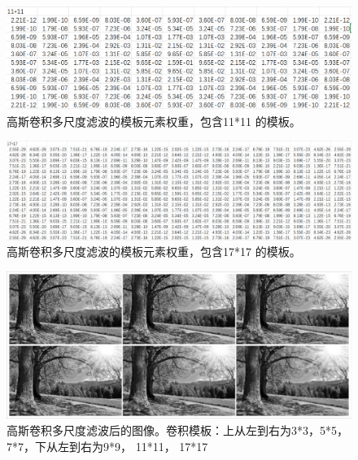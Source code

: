 \documentclass[10pt,twocolumn,letterpaper]{article}
\begin{document}
\begin{figure}[th]
   \centering
   \includegraphics[width=0.95\linewidth]{matrix2.png}
   \caption{高斯卷积多尺度滤波的模板元素权重，包含11*11 的模板。}   
   \label{fig:matrix2}
\end{figure}

\begin{figure}[th]
   \centering
   \includegraphics[width=0.95\linewidth]{matrix3.png}
   \caption{高斯卷积多尺度滤波的模板元素权重，包含17*17 的模板。}   
   \label{fig:matrix3}
\end{figure}

\clearpage

\begin{figure}[th]
   \centering
   \includegraphics[width=0.95\linewidth]{GaussScaleAll.pdf}
   \caption{高斯卷积多尺度滤波后的图像。卷积模板：上从左到右为3*3，5*5，7*7，下从左到右为9*9， 11*11， 17*17}   
   \label{fig:GaussScaleAll}
\end{figure}
\end{document}
